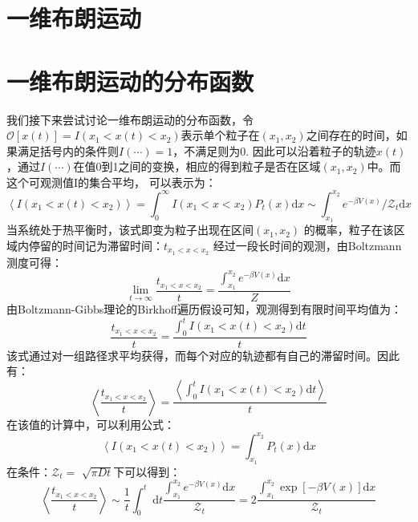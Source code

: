 \section{一维布朗运动}

\section{一维布朗运动的分布函数}
我们接下来尝试讨论一维布朗运动的分布函数，令
$\mathcal{O}[x(t)]=I\left(x_{1}<x(t)<x_{2}\right)$表示单个粒子在$\left(x_{1}, x_{2}\right)$之间存在的时间，如果满足括号内的条件则$I(\cdots)=1$，不满足则为0.
因此可以沿着粒子的轨迹$x(t)$，通过$I(\cdots)$在值0到1之间的变换，相应的得到粒子是否在区域$\left(x_{1}, x_{2}\right)$中。而这个可观测值I的集合平均，
可以表示为：
\begin{equation}
\left\langle I\left(x_{1}<x(t)<x_{2}\right)\right\rangle=\int_{0}^{\infty} I\left(x_{1}<x<x_{2}\right) P_{t}(x) \mathrm{d} x \sim \int_{x_{1}}^{x_{2}} e^{-\beta V(x)} / \mathcal{Z}_{t}\mathrm{d}x
\end{equation}
当系统处于热平衡时，该式即变为粒子出现在区间$\left(x_{1}, x_{2}\right)$ 的概率，粒子在该区域内停留的时间记为滞留时间：$t_{x_{1}<x<x_{2}}$
经过一段长时间的观测，由Boltzmann测度可得：
\begin{equation}
\lim _{t \rightarrow \infty}\frac{t_{x_{1}<x<x_{2}}}{ t}=\frac{\int_{x_{1}}^{x_{2}} e^{-\beta V(x)} \mathrm{d} x}{Z}
\end{equation}
由Boltzmann-Gibbs理论的Birkhoff遍历假设可知，观测得到有限时间平均值为：
\begin{equation}
\frac{t_{x_{1}<x<x_{2}}}{t}=\frac{\int_{0}^{t} I\left(x_{1}<x(t)<x_{2}\right) \mathrm{d} t}{t}
\end{equation}
该式通过对一组路径求平均获得，而每个对应的轨迹都有自己的滞留时间。因此有：\begin{equation}
\left\langle\frac{t_{x_{1}<x<x_{2}}}{t}\right\rangle=\frac{\left\langle\int_{0}^{t} I\left(x_{1}<x(t)<x_{2}\right) \mathrm{d} t\right\rangle}{t}
\end{equation}
在该值的计算中，可以利用公式：
\begin{equation}
\left\langle I\left(x_{1}<x(t)<x_{2}\right)\right\rangle=\int_{x_{1}}^{x_{2}} P_{t}(x) \mathrm{d} x
\end{equation}
在条件：$\mathcal{Z}_{t}=$ $\sqrt{\pi D t}$下可以得到：
\begin{equation}
\left\langle\frac{t_{x_{1}<x<x_{2}}}{t}\right\rangle \sim \frac{1}{t} \int_{0}^{t} \mathrm{~d} t \frac{\int_{x_{1}}^{x_{2}} e^{-\beta V(x)} \mathrm{d} x}{\mathcal{Z}_{t}}=
2 \frac{\int_{x_{1}}^{x_{2}} \exp [-\beta V(x)] \mathrm{d} x}{\mathcal{Z}_{t}}
\end{equation}
